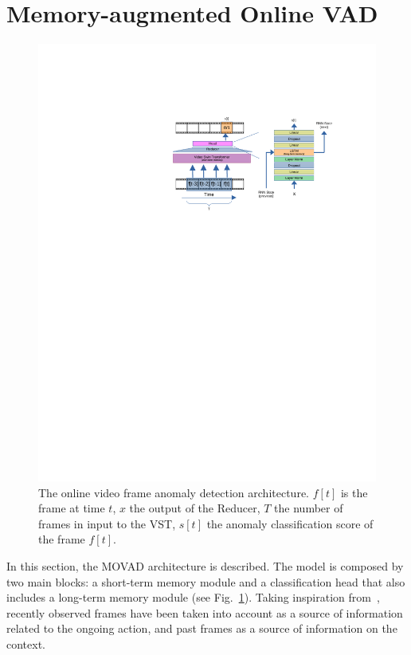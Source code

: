 \section{Memory-augmented Online VAD}
\label{sec:theory}

\fboxsep=1mm%
\fboxrule=1pt%

\begin{figure}[!ht]
            \centerline{\includegraphics[trim=205 490 80 130, clip, width=0.8\linewidth]{images/arch.pdf}}
        \caption{The online video frame anomaly detection architecture. $f[t]$ is the frame at time $t$, $x$ the output of the Reducer, $T$ the number of frames in input to the VST, $s[t]$ the anomaly classification score of the frame $f[t]$.}
		\label{fig:arch}
\end{figure}

In this section, the MOVAD architecture is described.  
The model is composed by two main blocks: a short-term memory module and a classification head that also includes a long-term  memory module (see Fig.~\ref{fig:arch}). 
Taking inspiration from~\cite{xu2021long}, recently observed frames have been taken into account as a source of information related to the ongoing action, and past frames as a source of information on the context.

